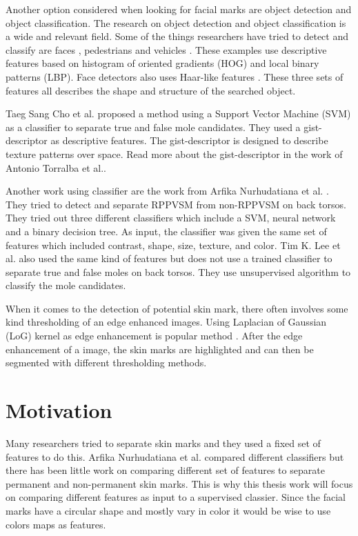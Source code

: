 Another option considered when looking for facial marks are object detection and object classification. The research on object detection and object classification is a wide and relevant field. Some of the things researchers have tried to detect and classify are faces \cite{facedetection_LBP}, pedestrians \cite{pedestrian_detection} and vehicles \cite{vehicle_hog}. These examples use descriptive features based on histogram of oriented gradients (HOG) and local binary patterns (LBP). Face detectors also uses Haar-like features \cite{face_detection}. These three sets of features all describes the shape and structure of the searched object.

Taeg Sang Cho et al.\cite{reliable_mole} proposed a method using a Support Vector Machine (SVM) as a classifier to separate true and false mole candidates. They used a gist-descriptor as descriptive features. The gist-descriptor is designed to describe texture patterns over space. Read more about the gist-descriptor in the work of Antonio Torralba et al.\cite{gist_descriptor}. 

Another work using classifier are the work from Arfika Nurhudatiana et al. \cite{torso_RPPVSM}. They tried to detect and separate RPPVSM from non-RPPVSM on back torsos. They tried out three different classifiers which include a SVM, neural network and a binary decision tree. As input, the classifier was given the same set of features which included contrast, shape, size, texture, and color. Tim K. Lee et al.\cite{torso_mole} also used the same kind of features but does not use a trained classifier to separate true and false moles on back torsos. They use unsupervised algorithm to classify the mole candidates. 

When it comes to the detection of potential skin mark, there often involves some kind thresholding of an edge enhanced images. Using Laplacian of Gaussian (LoG) kernel as edge enhancement is popular method \cite{tattoos,face_matching}. After the edge enhancement of a image, the skin marks are highlighted and can then be segmented with different thresholding methods. 

\section{Motivation}

Many researchers \cite{reliable_mole,torso_RPPVSM,torso_mole} tried to separate skin marks and they used a fixed set of features to do this. Arfika Nurhudatiana et al. compared different classifiers but there has been little work on comparing different set of features to separate permanent and non-permanent skin marks. This is why this thesis work will focus on comparing different features as input to a supervised classier. Since the facial marks have a circular shape and mostly vary in color it would be wise to use colors maps as features. 

